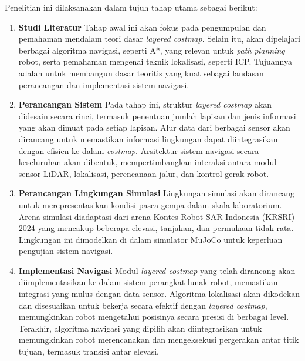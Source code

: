 
Penelitian ini dilaksanakan dalam tujuh tahap utama sebagai berikut:

\begin{enumerate}
  \item \textbf{Studi Literatur} \newline Tahap awal ini akan fokus pada
  pengumpulan dan pemahaman mendalam teori dasar \emph{layered
  costmap}. Selain itu, akan dipelajari berbagai algoritma navigasi,
  seperti A*, yang relevan untuk \emph{path planning} robot, serta
  pemahaman mengenai teknik lokalisasi, seperti ICP. Tujuannya adalah
  untuk membangun dasar teoritis yang kuat sebagai landasan perancangan
  dan implementasi sistem navigasi.

  \item \textbf{Perancangan Sistem} \newline Pada tahap ini, struktur
  \emph{layered costmap} akan didesain secara rinci, termasuk
  penentuan jumlah lapisan dan jenis informasi yang akan dimuat pada
  setiap lapisan. Alur data dari berbagai sensor akan dirancang untuk
  memastikan informasi lingkungan dapat diintegrasikan dengan efisien
  ke dalam \emph{costmap}. Arsitektur sistem navigasi secara
  keseluruhan akan dibentuk, mempertimbangkan interaksi antara modul
  sensor LiDAR, lokalisasi, perencanaan jalur, dan kontrol gerak
  robot.

  \item \textbf{Perancangan Lingkungan Simulasi} \newline Lingkungan simulasi
  akan dirancang untuk merepresentasikan kondisi pasca gempa dalam
  skala laboratorium. Arena simulasi diadaptasi dari arena Kontes
  Robot SAR Indonesia (KRSRI) 2024 yang mencakup beberapa elevasi,
  tanjakan, dan permukaan tidak rata. Lingkungan ini dimodelkan di
  dalam simulator MuJoCo untuk keperluan pengujian sistem navigasi.

  \item \textbf{Implementasi Navigasi} \newline Modul \emph{layered costmap}
  yang telah dirancang akan diimplementasikan ke dalam sistem
  perangkat lunak robot, memastikan integrasi yang mulus dengan data
  sensor. Algoritma lokalisasi akan dikodekan dan disesuaikan untuk
  bekerja secara efektif dengan \emph{layered costmap}, memungkinkan
  robot mengetahui posisinya secara presisi di berbagai level.
  Terakhir, algoritma navigasi yang dipilih akan diintegrasikan untuk
  memungkinkan robot merencanakan dan mengeksekusi pergerakan antar
  titik tujuan, termasuk transisi antar elevasi.


\end{enumerate}
